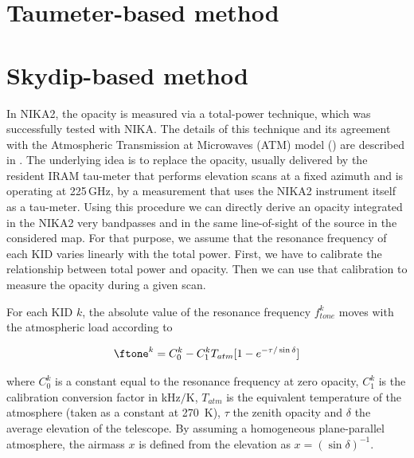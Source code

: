 \section{Taumeter-based method}
\label{se:taumeter-method}


\section{Skydip-based method}
\label{se:skydip-method}

In NIKA2, the opacity is measured via a total-power technique, which was
successfully tested with NIKA. The details of this technique and its agreement
with the Atmospheric Transmission at Microwaves (ATM) model
(\cite{2001IEEE....49.1683C}) are described in \cite{Catalano:2014nml}. The
underlying idea is to replace the opacity, usually delivered by the resident
IRAM tau-meter that performs elevation scans at a fixed azimuth and is
operating at 225\,GHz, by a measurement that uses the NIKA2 instrument itself
as a tau-meter. Using this procedure we can directly derive an opacity
integrated in the NIKA2 very bandpasses and in the same line-of-sight of the
source in the considered map. For that purpose, we assume that the resonance
frequency of each KID varies linearly with the total power. First, we have to
calibrate the relationship between total power and opacity. Then we can use
that calibration to measure the opacity during a given scan.

For each KID $k$, the absolute value of the resonance frequency
$f_{tone}^k$ moves with the atmospheric load according to

\begin{equation}
\ftone^k  = C_0^k - C_1^k T_{atm}[1-e^{-\tau/\sin\delta}]
\label{eq:skydip}
\end{equation}


where $C_0^k$ is a constant equal to the resonance
frequency at zero opacity, $C_1^k$ is the calibration conversion
factor in kHz$/$K, $T_{atm}$ is the equivalent temperature
of the atmosphere (taken as a constant at 270~K), $\tau$ the zenith
opacity and $\delta$ the average elevation of the telescope.
By assuming a homogeneous plane-parallel atmosphere, the airmass $x$ is defined from the
elevation as $x = \left(\sin\delta\right)^{-1}$. 

